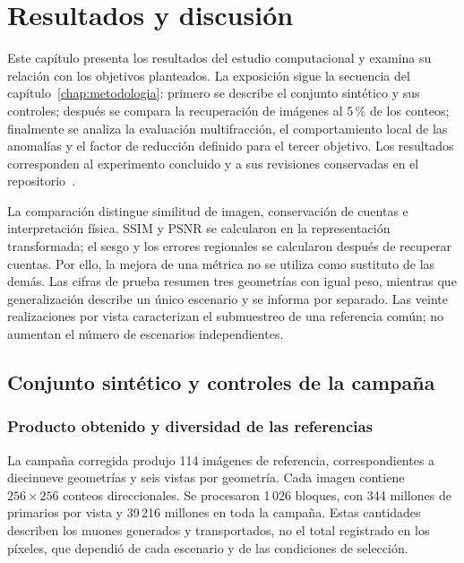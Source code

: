 \chapter{Resultados y discusión}
\label{chap:resultados}

Este capítulo presenta los resultados del estudio computacional y examina su relación con los objetivos planteados. La exposición sigue la secuencia del capítulo~\ref{chap:metodologia}: primero se describe el conjunto sintético y sus controles; después se compara la recuperación de imágenes al 5\,\% de los conteos; finalmente se analiza la evaluación multifracción, el comportamiento local de las anomalías y el factor de reducción definido para el tercer objetivo. Los resultados corresponden al experimento concluido y a sus revisiones conservadas en el repositorio~\parencite{repositorioMuografia2026}.

La comparación distingue similitud de imagen, conservación de cuentas e interpretación física. SSIM y PSNR se calcularon en la representación transformada; el sesgo y los errores regionales se calcularon después de recuperar cuentas. Por ello, la mejora de una métrica no se utiliza como sustituto de las demás. Las cifras de prueba resumen tres geometrías con igual peso, mientras que generalización describe un único escenario y se informa por separado. Las veinte realizaciones por vista caracterizan el submuestreo de una referencia común; no aumentan el número de escenarios independientes.

\section{Conjunto sintético y controles de la campaña}\label{sec:res-oe1}
\subsection{Producto obtenido y diversidad de las referencias}
La campaña corregida produjo 114 imágenes de referencia, correspondientes a diecinueve geometrías y seis vistas por geometría. Cada imagen contiene $256\times256$ conteos direccionales. Se procesaron 1\,026 bloques, con 344 millones de primarios por vista y 39\,216 millones en toda la campaña. Estas cantidades describen los muones generados y transportados, no el total registrado en los píxeles, que dependió de cada escenario y de las condiciones de selección.

